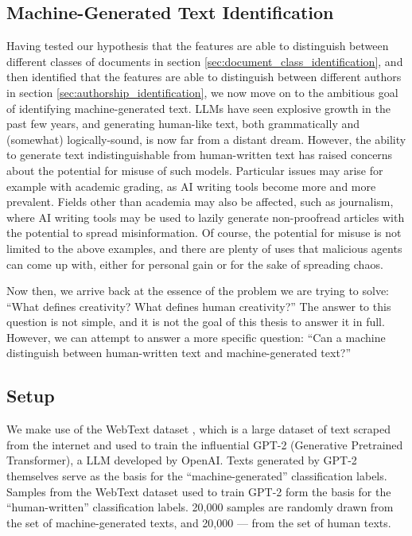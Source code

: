 \subsection{Machine-Generated Text Identification}
Having tested our hypothesis that the features are able to distinguish between different classes of documents in section \ref{sec:document_class_identification}, and then identified that the features are able to distinguish between different authors in section \ref{sec:authorship_identification}, we now move on to the ambitious goal of identifying machine-generated text. LLMs have seen explosive growth in the past few years, and generating human-like text, both grammatically and (somewhat) logically-sound, is now far from a distant dream. However, the ability to generate text indistinguishable from human-written text has raised concerns about the potential for misuse of such models. Particular issues may arise for example with academic grading, as AI writing tools become more and more prevalent. Fields other than academia may also be affected, such as journalism, where AI writing tools may be used to lazily generate non-proofread articles with the potential to spread misinformation. Of course, the potential for misuse is not limited to the above examples, and there are plenty of uses that malicious agents can come up with, either for personal gain or for the sake of spreading chaos.

Now then, we arrive back at the essence of the problem we are trying to solve: ``What defines creativity? What defines human creativity?'' The answer to this question is not simple, and it is not the goal of this thesis to answer it in full. However, we can attempt to answer a more specific question: ``Can a machine distinguish between human-written text and machine-generated text?''

\subsection*{Setup}
We make use of the WebText dataset \citep{radford2019_gpt2}, which is a large dataset of text scraped from the internet and used to train the influential GPT-2 (Generative Pretrained Transformer), a LLM developed by OpenAI. Texts generated by GPT-2 themselves serve as the basis for the ``machine-generated'' classification labels. Samples from the WebText dataset used to train GPT-2 form the basis for the ``human-written'' classification labels. 20,000 samples are randomly drawn from the set of machine-generated texts, and 20,000 --- from the set of human texts.

